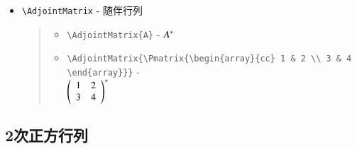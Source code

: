 \documentclass[oneside,10pt,a4paper]{jsarticle}
\begin{document}
\begin{itemize}
\begin{quote}
\begin{itemize}
        \end{itemize}
      \end{quote}
    \newpage
    \item \verb|\AdjointMatrix| - 随伴行列
      \begin{quote}
        \Example
        \begin{itemize}
          \item \verb|\AdjointMatrix{A}| - ${A}^{\ast}$
          \item \verb|\AdjointMatrix{\Pmatrix{\begin{array}{cc} 1 & 2 \\ 3 & 4 \end{array}}}| - \\ ${\left( \begin{array}{cc} 1 & 2 \\ 3 & 4 \end{array} \right)}^{\ast}$
        \end{itemize}
      \end{quote}
  \end{itemize}

  \newpage

  \subsection{2次正方行列}
\end{document}
